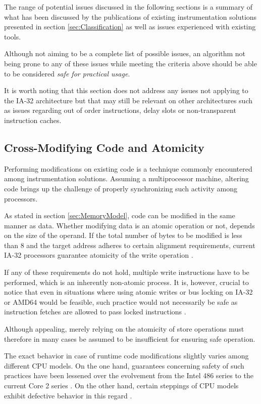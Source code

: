 The range of potential issues discussed in the following sections is a summary
of what has been discussed by the publications of existing instrumentation 
solutions presented in section \ref{sec:Classification} as well as issues experienced with existing
tools.

Although not aiming to be a complete list of possible issues, an algorithm 
not being prone to any of these issues while meeting the criteria above should 
be able to be considered \emph{safe for practical usage}.

It is worth noting that this section does not address any issues not applying
to the IA-32 architecture but that may still be relevant on other architectures such as
issues regarding out of order instructions, delay slots or non-transparent instruction caches.

\subsection{Cross-Modifying Code and Atomicity}
\label{sec:Atomicity}
Performing modifications on existing code is a technique commonly encountered among
instrumentation solutions. Assuming a multiprocessor machine, altering code
brings up the challenge of properly synchronizing such activity among processors.

As stated in section \ref{sec:MemoryModel}, code can be modified in the same manner as data. Whether
modifying data is an atomic operation or not, depends on the size of the operand. If the total number of 
bytes to be modified is less than 8 and the target address adheres to certain alignment requirements, 
current IA-32 processors guarantee atomicity of the write operation \cite{intel07_3A}.

If any of these requirements do not hold, multiple write instructions have to be performed, which
is an inherently non-atomic process.
It is, however, crucial to notice that even in situations where using atomic writes 
or bus locking on IA-32 or AMD64 would be feasible, such practice would not necessarily be safe as 
instruction fetches are allowed to pass locked instructions \cite{intel07_3A}.

Although appealing, merely relying on the atomicity of store operations must therefore 
in many cases be assumed to be insufficient for ensuring safe operation.

The exact behavior in case of runtime code modifications slightly varies among
different CPU models. On the one hand, guarantees concerning safety of such practices have been
lessened over the evolvement from the Intel 486 series to the current Core 2 series \cite{intel07_3A}. 
On the other hand, certain steppings of CPU models exhibit defective behavior in this regard \cite{intel02_Err}. 

